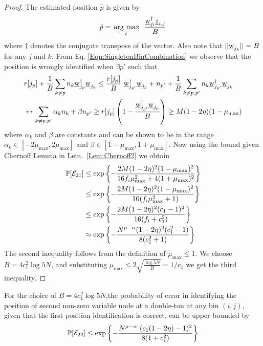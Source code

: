 \begin{proof}
	The estimated position $\hat{p}$ is given by
	\begin{align}
	\label{Eqn:SingletonBinCombination}
	\hat{p}= \underset{l}{\operatorname*{\,arg\ max}}~~ \frac{\underline{\mathrm{w}}_{j_l}^{\dagger}\underline{z}_{i,j}}{B}
	\end{align}
	where $\dagger$ denotes the conjugate transpose of the vector. Also note that $|| \underline{\mathrm{w}}_{j_k}||=B$ for any $j$ and $k$.  From Eq. \eqref{Eqn:SingletonBinCombination} we observe that the position is wrongly identified when $\exists p'$ such that
	\begin{align*}
	&r[j_p] + \frac{1}{B}\sum_{k \neq p} n_k 	\underline{\mathrm{w}}_{j_p}^{\dagger}\underline{\mathrm{w}}_{j_k} \leq \frac{r[j_p]}{B} ~ \underline{\mathrm{w}}_{j_{p'}}^{\dagger}\underline{\mathrm{w}}_{j_p}+ n_{p'}+\frac{1}{B}\sum_{k \neq p,p'}n_k\underline{\mathrm{w}}_{j_{p'}}^{\dagger} \underline{\mathrm{w}}_{j_k} \\
	&\leftrightarrow \sum_{k \neq p,p'}\alpha_k n_k+\beta n_{p'}\geq  r[j_p]\left(1-\frac{\underline{\mathrm{w}}_{j_{p'}}^{\dagger}\underline{\mathrm{w}}_{j_p}}{B}\right)\geq M(1-2\eta)(1-\mu_{\text{max}})
	\end{align*}
	where $\alpha_k$ and $\beta$ are constants and can be shown to be in the range $\alpha_k\in[-2\mu_\text{max},2\mu_\text{max}]$ and $\beta\in[1-\mu_\text{max},1+\mu_\text{max}]$. Now using the bound given Chernoff Lemma in Lem.~\ref{Lem:Chernoff2} we obtain
	\begin{align*}
	\mathbb{P}[\mathcal{E}_{21}]&\leq \exp\left\lbrace-\frac{2M(1-2\eta)^2(1-\mu_{\text{max}})^2}{16f_i\mu^2_{\max}+4(1+\mu_{\max})^2}\right\rbrace\\
	&\leq\exp\left\lbrace-\frac{2M(1-2\eta)^2(1-\mu_{\text{max}})^2}{16(f_i\mu^2_{\max}+1)}\right\rbrace\\
	&\leq\exp\left\lbrace-\frac{2M(1-2\eta)^2(c_1-1)^2}{16(f_i+c_1^2)}\right\rbrace\\
	&\approx\exp\left\lbrace-\frac{N^{\mu-\alpha}(1-2\eta)^2(c_1^2-1)}{8(c_1^2+1)}\right\rbrace\\
	\end{align*}
The second inequality follows from the definition of  $\mu_{\text{max}} \leq 1$. We choose $B=4c_1^2\log 5N$, and substituting $\mu_{\max}\leq 2\sqrt{\frac{\log 5N}{B}} = 1/c_1$ we get the third inequality.
	
\end{proof}
\begin{lemma}
For the choice of $B=4c_1^2\log 5N$,the probability of error in identifying the position of second non-zero variable node at a double-ton at any bin $(i,j)$, given that the first position identification is correct, can be upper bounded by
\begin{align*}
\mathbb{P}[\mathcal{E}_{22}]\leq \exp\left\lbrace-\frac{N^{\mu - \alpha} ~ (c_1(1 - 2\eta) - 1)^2}{8(1+ c_1^2)}\right\rbrace
\end{align*}
\end{lemma}
